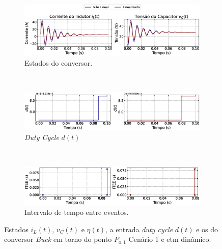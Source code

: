 \begin{figure}[H]
  \centering
  \captionsetup{justification=centering}
  \begin{subfigure}{1.\textwidth}
    \centering
    \includegraphics[width=1.\textwidth]{figuras/dynamic-etm/buck/sim1/op1/result.eps}
    \caption{Estados do conversor.}
    \label{fig:buck_converter_constant_pcpl_dynamic_etm_op1_a}
  \end{subfigure}
  \\[6pt]
  \begin{subfigure}{1.\textwidth}
    \centering
    \includegraphics[width=1.\textwidth]{figuras/dynamic-etm/buck/sim1/op1/duty-cycle.eps}
    \caption{\textit{Duty Cycle} $d(t)$}
    \label{fig:buck_converter_constant_pcpl_dynamic_etm_op1_b}
  \end{subfigure}
  \\[6pt]
  \begin{subfigure}{1.\textwidth}
    \centering
    \includegraphics[width=1.\textwidth]{figuras/dynamic-etm/buck/sim1/op1/inter-event-times.eps}
    \caption{Intervalo de tempo entre eventos.}
    \label{fig:buck_converter_constant_pcpl_dynamic_etm_op1_c}
  \end{subfigure}
  \caption{Estados $i_L(t)$, $v_C(t)$ e $\eta(t)$, a entrada \textit{duty cycle} $d(t)$ e os  do conversor \textit{Buck} em torno do ponto $P_{\mathrm{o}, 1}$ Cenário 1 e \acrshort{etm} dinâmico.}
  \label{fig:buck_converter_constant_pcpl_dynamic_etm_op1}
\end{figure}

